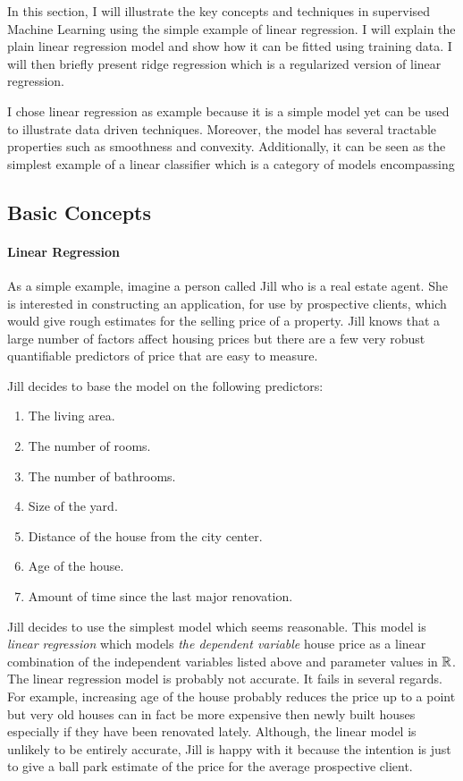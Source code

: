 In this section, I will illustrate the key concepts and techniques in
supervised Machine Learning using the simple example of linear regression. I will explain the plain linear regression model and show how it can be fitted using training data. I will then briefly present ridge regression which is a regularized version of linear regression.

I chose linear regression as example because it is a simple model yet
can be used to illustrate data driven techniques. Moreover, the model
has several tractable properties such as smoothness and
convexity. Additionally, it can be seen as the simplest example of a
linear classifier which is a category of models encompassing

\subsection{Basic Concepts}

\paragraph{Linear Regression} As a simple example, imagine a person
called Jill who is a real estate agent. She is interested in
constructing an application, for use by prospective clients, which
would give rough estimates for the selling price of a property. Jill
knows that a large number of factors affect housing prices but there
are a few very robust quantifiable predictors of price that are easy
to measure.

Jill decides to base the model on the following predictors:
\begin{enumerate}
\item The living area.
\item The number of rooms.
\item The number of bathrooms.
\item Size of the yard.
\item Distance of the house from the city center.
\item Age of the house.
\item Amount of time since the last major renovation.
\end{enumerate}

Jill decides to use the simplest model which seems reasonable. This
model is {\it linear regression} which models {\it the dependent
  variable} house price as a linear combination of the independent
variables listed above and parameter values in $\mbox{$\mathbb R$}$. The linear
regression model is probably not accurate. It fails in several
regards. For example, increasing age of the house probably reduces the
price up to a point but very old houses can in fact be more expensive
then newly built houses especially if they have been renovated lately.
Although, the linear model is unlikely to be entirely accurate, Jill is
happy with it because the intention is just to give a ball park
estimate of the price for the average prospective client.

